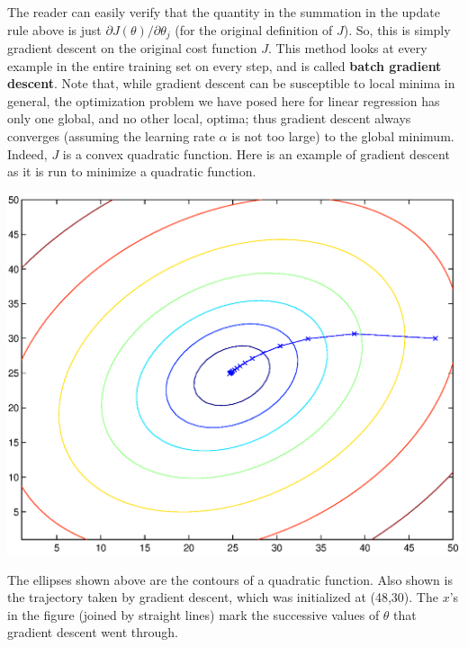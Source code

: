 \documentclass{article}
\begin{document}
The reader can easily verify that the quantity in the summation in the update rule above
is just
$\partial J(\theta)/\partial\theta_j$ (for the original definition of $J$).  So,
this is simply gradient descent on the original cost function $J$.  This method
looks at every example in the entire training set on every step, and is
called {\bf batch gradient descent}.  Note that, while gradient descent can
be susceptible to local minima in general, the optimization problem we have
posed here for linear regression has only one global, and no other local, optima; thus
gradient descent always converges (assuming the learning rate $\alpha$ is not too large)
to the global minimum.  Indeed, $J$ is a convex quadratic function.  Here is an
example of gradient descent as it is run to minimize a quadratic function.
\begin{center}
\includegraphics[scale=0.4]{quadracticGD20.eps}
\end{center}
The ellipses shown above are the contours of a quadratic function.  Also
shown is the trajectory taken by gradient descent, which was initialized
at (48,30).  The $x$'s in the figure (joined by straight lines) mark the
successive values of $\theta$ that gradient descent went through.
\end{document}
